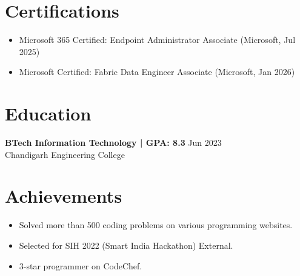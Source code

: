 \documentclass[11pt,a4paper]{article}
\begin{document}
\section{Certifications}
\begin{itemize}
  \item Microsoft 365 Certified: Endpoint Administrator Associate (Microsoft, Jul 2025)
  \item Microsoft Certified: Fabric Data Engineer Associate (Microsoft, Jan 2026)
\end{itemize}

\section{Education}
\textbf{BTech Information Technology | GPA: 8.3} \hfill Jun 2023
\\ Chandigarh Engineering College
\vspace{2pt}

\section{Achievements}
\begin{itemize}
  \item Solved more than 500 coding problems on various programming websites.
  \item Selected for SIH 2022 (Smart India Hackathon) External.
  \item 3-star programmer on CodeChef.
\end{itemize}
\end{document}
